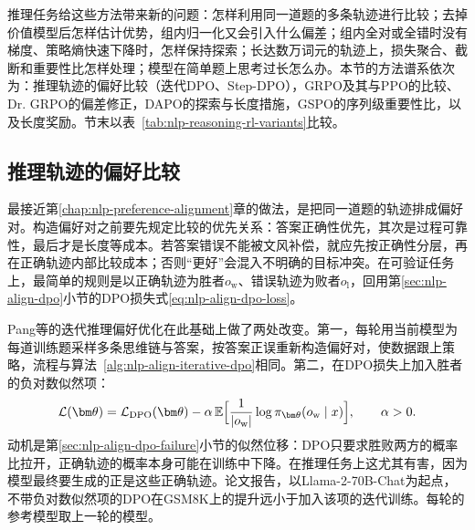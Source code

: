 推理任务给这些方法带来新的问题：怎样利用同一道题的多条轨迹进行比较；去掉价值模型后怎样估计优势，组内归一化又会引入什么偏差；组内全对或全错时没有梯度、策略熵快速下降时，怎样保持探索；长达数万词元的轨迹上，损失聚合、截断和重要性比怎样处理；模型在简单题上思考过长怎么办。本节的方法谱系依次为：推理轨迹的偏好比较（迭代DPO、Step-DPO），GRPO及其与PPO的比较、Dr. GRPO的偏差修正，DAPO的探索与长度措施，GSPO的序列级重要性比，以及长度奖励。节末以表~\ref{tab:nlp-reasoning-rl-variants}比较。

\subsection{推理轨迹的偏好比较}
\label{sec:nlp-reasoning-preferences}

最接近第\ref{chap:nlp-preference-alignment}章的做法，是把同一道题的轨迹排成偏好对。构造偏好对之前要先规定比较的优先关系：答案正确性优先，其次是过程可靠性，最后才是长度等成本。若答案错误不能被文风补偿，就应先按正确性分层，再在正确轨迹内部比较成本；否则“更好”会混入不明确的目标冲突。在可验证任务上，最简单的规则是以正确轨迹为胜者$o_{\mathrm w}$、错误轨迹为败者$o_{\mathrm l}$，回用第\ref{sec:nlp-align-dpo}小节的DPO损失式\eqref{eq:nlp-align-dpo-loss}。

Pang等的迭代推理偏好优化在此基础上做了两处改变。第一，每轮用当前模型为每道训练题采样多条思维链与答案，按答案正误重新构造偏好对，使数据跟上策略，流程与算法~\ref{alg:nlp-align-iterative-dpo}相同。第二，在DPO损失上加入胜者的负对数似然项：
\begin{equation}
  \mathcal L(\bm\theta)=\mathcal L_{\mathrm{DPO}}(\bm\theta)
  -\alpha\,\mathbb E\Bigl[\frac{1}{|o_{\mathrm w}|}\log\pi_{\bm\theta}(o_{\mathrm w}\mid x)\Bigr],\qquad \alpha>0.
  \label{eq:nlp-reasoning-irpo}
\end{equation}
动机是第\ref{sec:nlp-align-dpo-failure}小节的似然位移：DPO只要求胜败两方的概率比拉开，正确轨迹的概率本身可能在训练中下降。在推理任务上这尤其有害，因为模型最终要生成的正是这些正确轨迹。论文报告，以Llama-2-70B-Chat为起点，不带负对数似然项的DPO在GSM8K上的提升远小于加入该项的迭代训练。每轮的参考模型取上一轮的模型。

